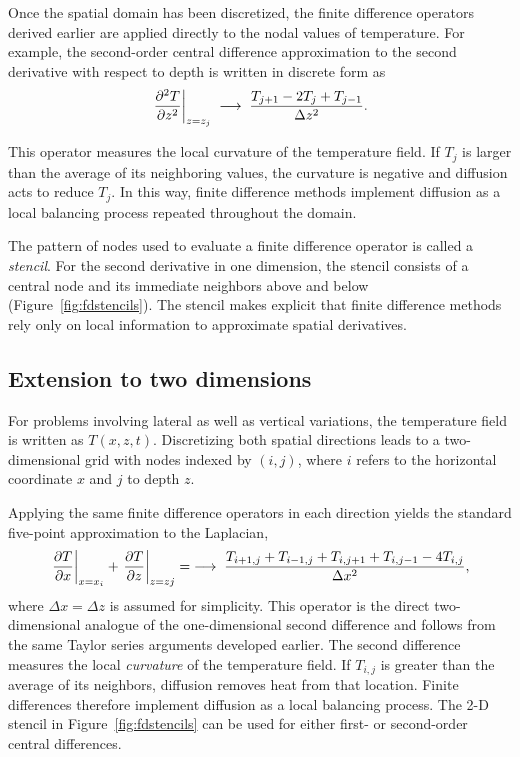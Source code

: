 Once the spatial domain has been discretized, the finite difference operators derived earlier are applied directly to the nodal values of temperature. For example, the second-order central difference approximation to the second derivative with respect to depth is written in discrete form as
\[
    \eval{\pdv[2]{T}{z}}_{z=z_j} \;\longrightarrow\;
    \frac{T_{j+1} - 2T_j + T_{j-1}}{\Delta z^2}.
\]

This operator measures the local curvature of the temperature field. If $T_j$ is larger than the average of its neighboring values, the curvature is negative and diffusion acts to reduce $T_j$. In this way, finite difference methods implement diffusion as a local balancing process repeated throughout the domain.

The pattern of nodes used to evaluate a finite difference operator is called a \emph{stencil}. For the second derivative in one dimension, the stencil consists of a central node and its immediate neighbors above and below (Figure~\ref{fig:fdstencils}). The stencil makes explicit that finite difference methods rely only on local information to approximate spatial derivatives.


\subsection{Extension to two dimensions}

For problems involving lateral as well as vertical variations, the temperature field is written as $T(x,z,t)$. Discretizing both spatial directions leads to a two-dimensional grid with nodes indexed by $(i,j)$, where $i$ refers to the horizontal coordinate $x$ and $j$ to depth $z$.

Applying the same finite difference operators in each direction yields the standard five-point approximation to the Laplacian,
\[
    \eval{\pdv{T}{x}}_{x=x_i} + \eval{\pdv{T}{z}}_{z=zj} =  \;\longrightarrow\;
    \frac{T_{i+1,j} + T_{i-1,j} + T_{i,j+1} + T_{i,j-1} - 4T_{i,j}}{\Delta x^2},
\]
where $\Delta x = \Delta z$ is assumed for simplicity. This operator is the direct two-dimensional analogue of the one-dimensional second difference and follows from the same Taylor series arguments developed earlier.  The second difference measures the local \emph{curvature} of the temperature field. If $T_{i,j}$ is greater than the average of its neighbors, diffusion removes heat from that location. Finite differences therefore implement diffusion as a local balancing process.
The 2-D stencil in Figure~\ref{fig:fdstencils} can be used for either first- or second-order central differences.  

